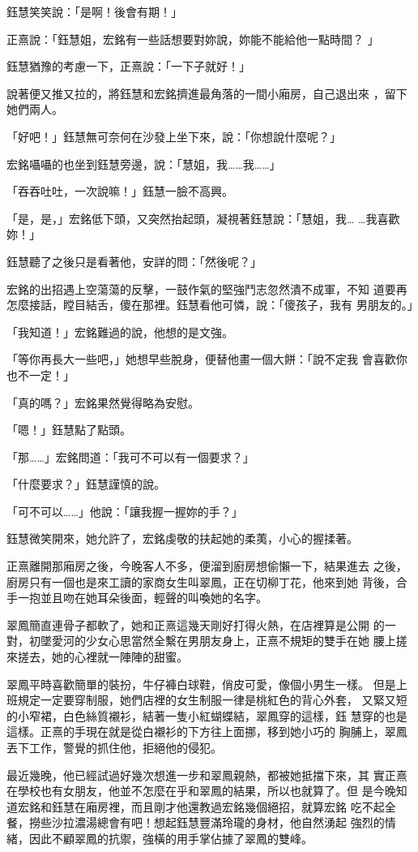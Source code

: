 鈺慧笑笑說：「是啊！後會有期！」

正熹說：「鈺慧姐，宏銘有一些話想要對妳說，妳能不能給他一點時間？
」

鈺慧猶豫的考慮一下，正熹說：「一下子就好！」

說著便又推又拉的，將鈺慧和宏銘擠進最角落的一間小廂房，自己退出來
，留下她們兩人。

「好吧！」鈺慧無可奈何在沙發上坐下來，說：「你想說什麼呢？」

宏銘囁囁的也坐到鈺慧旁邊，說：「慧姐，我……我……」

「吞吞吐吐，一次說嘛！」鈺慧一臉不高興。

「是，是，」宏銘低下頭，又突然抬起頭，凝視著鈺慧說：「慧姐，我…
…我喜歡妳！」

鈺慧聽了之後只是看著他，安詳的問：「然後呢？」

宏銘的出招遇上空蕩蕩的反擊，一鼓作氣的堅強鬥志忽然潰不成軍，不知
道要再怎麼接話，瞠目結舌，傻在那裡。鈺慧看他可憐，說：「傻孩子，我有
男朋友的。」

「我知道！」宏銘難過的說，他想的是文強。

「等你再長大一些吧，」她想早些脫身，便替他畫一個大餅：「說不定我
會喜歡你也不一定！」

「真的嗎？」宏銘果然覺得略為安慰。

「嗯！」鈺慧點了點頭。

「那……」宏銘問道：「我可不可以有一個要求？」

「什麼要求？」鈺慧謹慎的說。

「可不可以……」他說：「讓我握一握妳的手？」

鈺慧微笑開來，她允許了，宏銘虔敬的扶起她的柔荑，小心的握揉著。

正熹離開那廂房之後，今晚客人不多，便溜到廚房想偷懶一下，結果進去
之後，廚房只有一個也是來工讀的家商女生叫翠鳳，正在切柳丁花，他來到她
背後，合手一抱並且吻在她耳朵後面，輕聲的叫喚她的名字。

翠鳳簡直連骨子都軟了，她和正熹這幾天剛好打得火熱，在店裡算是公開
的一對，初墜愛河的少女心思當然全繫在男朋友身上，正熹不規矩的雙手在她
腰上搓來搓去，她的心裡就一陣陣的甜蜜。

翠鳳平時喜歡簡單的裝扮，牛仔褲白球鞋，俏皮可愛，像個小男生一樣。
但是上班規定一定要穿制服，她們店裡的女生制服一律是桃紅色的背心外套，
又緊又短的小窄裙，白色絲質襯衫，結著一隻小紅蝴蝶結，翠鳳穿的這樣，鈺
慧穿的也是這樣。正熹的手現在就是從白襯衫的下方往上面挪，移到她小巧的
胸脯上，翠鳳丟下工作，警覺的抓住他，拒絕他的侵犯。

最近幾晚，他已經試過好幾次想進一步和翠鳳親熱，都被她抵擋下來，其
實正熹在學校也有女朋友，他並不怎麼在乎和翠鳳的結果，所以也就算了。但
是今晚知道宏銘和鈺慧在廂房裡，而且剛才他還教過宏銘幾個絕招，就算宏銘
吃不起全餐，撈些沙拉濃湯總會有吧！想起鈺慧豐滿玲瓏的身材，他自然湧起
強烈的情緒，因此不顧翠鳳的抗禦，強橫的用手掌佔據了翠鳳的雙峰。

